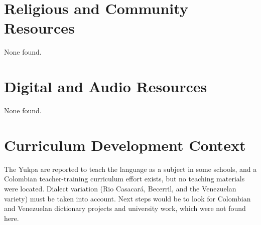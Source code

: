 \documentclass[12pt]{article}
\begin{document}
\section{Religious and Community Resources}
None found.

\section{Digital and Audio Resources}
None found.

\section{Curriculum Development Context}
The Yukpa are reported to teach the language as a subject in some schools, and a Colombian teacher-training curriculum effort exists, but no teaching materials were located. Dialect variation (Rio Casacar\'a, Becerril, and the Venezuelan variety) must be taken into account. Next steps would be to look for Colombian and Venezuelan dictionary projects and university work, which were not found here.
\end{document}
